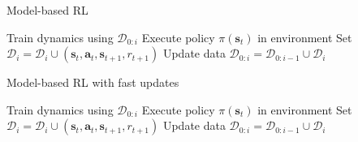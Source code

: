 \documentclass{article}
\newcommand{\state}{\ensuremath{\mathbf{s}}}
\newcommand{\action}{\ensuremath{\mathbf{a}}}
\newcommand{\dataset}{\ensuremath{\mathcal{D}}}
\newcommand{\policy}{\ensuremath{\pi}}
\begin{document}
\begin{algorithm}[H]
\caption{Model-based RL}\label{alg-mbrl}
\begin{algorithmic}[1]
    \State Train dynamics using $\dataset_{0:i}$
      \State Execute policy $\policy(\state_{t})$ in environment
      \State Set $\mathcal{D}_{i} = \mathcal{D}_{i} \cup (\state_{t}, \action_{t}, \state_{t+1}, r_{t+1})$
    \EndFor
    \State Update data $\mathcal{D}_{0:i} = \mathcal{D}_{0:i-1} \cup \mathcal{D}_{i}$
\EndFor
\end{algorithmic}
\end{algorithm}
\begin{algorithm}[H]
\caption{Model-based RL with fast updates}\label{alg-mbrl-fast-updates}
\begin{algorithmic}[1]
    \State Train dynamics using $\dataset_{0:i}$
      \State Execute policy $\policy(\state_{t})$ in environment
      \State Set $\mathcal{D}_{i} = \mathcal{D}_{i} \cup (\state_{t}, \action_{t}, \state_{t+1}, r_{t+1})$
    \EndFor
    \State Update data $\mathcal{D}_{0:i} = \mathcal{D}_{0:i-1} \cup \mathcal{D}_{i}$
\EndFor
\end{algorithmic}
\end{algorithm}
\end{document}
